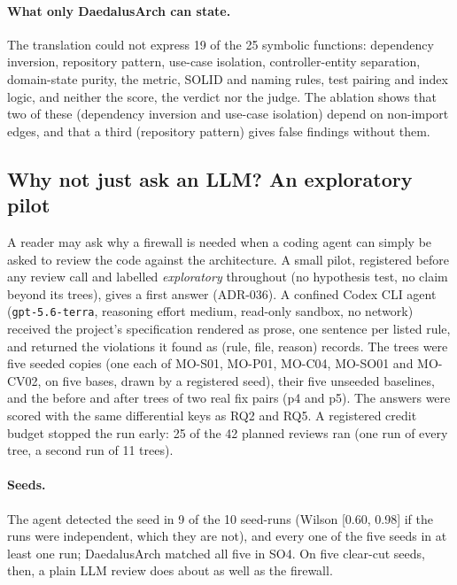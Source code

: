 \documentclass[10pt,a4paper]{article}
\newcommand{\tool}{DaedalusArch}
\begin{document}
\paragraph{What only \tool{} can state.}
The translation could not express 19 of the 25 symbolic functions: dependency inversion, repository pattern, use-case
isolation, controller-entity separation, domain-state purity, the metric, SOLID and naming rules, test pairing and
index logic, and neither the score, the verdict nor the judge. %
The ablation shows that two of these (dependency inversion and use-case isolation) depend on non-import edges, and
that a third (repository pattern) gives false findings without them.

\subsection{Why not just ask an LLM? An exploratory pilot}\label{sec:llmreview}

A reader may ask why a firewall is needed when a coding agent can simply be asked to review the code against the
architecture. A small pilot, registered before any review call and labelled \emph{exploratory} throughout (no
hypothesis test, no claim beyond its trees), gives a first answer (ADR-036). A confined Codex CLI agent
(\texttt{gpt-5.6-terra}, reasoning effort medium, read-only sandbox, no network) received the project's
specification rendered as prose, one sentence per listed rule, and returned the violations it found as
(rule, file, reason) records. The trees were five seeded copies (one each of MO-S01, MO-P01, MO-C04, MO-SO01 and
MO-CV02, on five bases, drawn by a registered seed), their five unseeded baselines, and the before and after trees
of two real fix pairs (p4 and p5). The answers were scored with the same differential keys as RQ2 and RQ5.
A registered credit budget stopped the run early: 25 of the 42 planned reviews ran (one run of every tree, a second
run of 11 trees).

\paragraph{Seeds.} The agent detected the seed in 9 of the 10 seed-runs (Wilson [0.60, 0.98] if the runs were
independent, which they are not), and every one of the five seeds in at least one run; \tool{} matched all five in
SO4. %
On five clear-cut seeds, then, a plain LLM review does about as well as the firewall.
\end{document}
